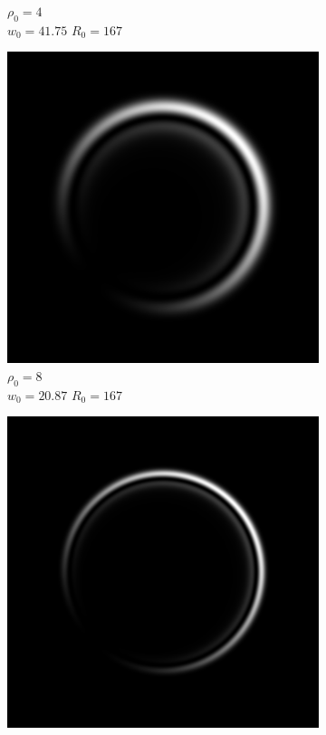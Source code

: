 \documentclass[11pt, a4paper, twoside]{article} %
\begin{document}
\begin{figure}[h!]
\begin{subfigure}[b]{0.245\linewidth}
    \caption{$\rho_0=4$\\ $w_0=41.75$ $R_0=167$}
     \end{subfigure}
 \begin{subfigure}[b]{0.245\linewidth}
     \includegraphics[width=\linewidth]{simul43.png}
    \caption{$\rho_0=8$\\ $w_0=20.87$ $R_0=167$}
     \end{subfigure}
  \begin{subfigure}[b]{0.245\linewidth}
     \includegraphics[width=\linewidth]{simul44.png}

\end{subfigure}
\end{figure}
\end{document}
